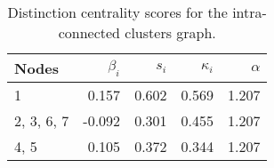 \begin{table}
\centering
\caption{\label{tab:intra}Distinction centrality scores for the intra-connected clusters graph.}
\centering
\begin{tabular}[t]{lrrrr}
\toprule
Nodes & $\beta_i$ & $s_i$ & $\kappa_i$ & $\alpha$\\
\midrule
1 & 0.157 & 0.602 & 0.569 & 1.207\\
2, 3, 6, 7 & -0.092 & 0.301 & 0.455 & 1.207\\
4, 5 & 0.105 & 0.372 & 0.344 & 1.207\\
\bottomrule
\end{tabular}
\end{table}
